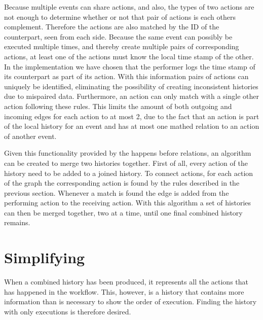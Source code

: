	\newpar Because multiple events can share actions, and also, the types of two actions are not enough to determine whether or not that pair of actions is each others complement. Therefore the actions are also matched by the ID of the counterpart, seen from each side. Because the same event can possibly be executed multiple times, and thereby create multiple pairs of corresponding actions, at least one of the actions must know the local time stamp of the other. In the implementation we have chosen that the performer logs the time stamp of its counterpart as part of its action. With this information pairs of actions can uniquely be identified, eliminating the possibility of creating inconsistent histories due to mispaired data. Furthermore, an action can only match with a single other action following these rules. This limits the amount of both outgoing and incoming edges for each action to at most 2, due to the fact that an action is part of the local history for an event and has at most one mathed relation to an action of another event.
	
	Given this functionality provided by the happens before relations, an algorithm can be created to merge two histories together. First of all, every action of the history need to be added to a joined history. To connect actions, for each action of the graph the corresponding action is found by the rules described in the previous section. Whenever a match is found the edge is added from the performing action to the receiving action. With this algorithm a set of histories can then be merged together, two at a time, until one final combined history remains.
	
	\section{Simplifying}
	When a combined history has been produced, it represents all the actions that has happened in the workflow. This, however, is a history that contains more information than is necessary to show the order of execution. Finding the history with only executions is therefore desired.
	
	
